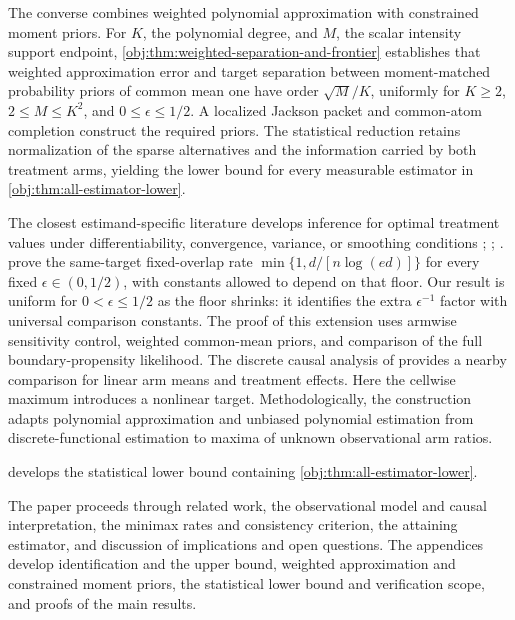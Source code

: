 \documentclass[11pt]{article}
\begin{document}
The converse combines weighted polynomial approximation with constrained moment priors. For \(K\), the polynomial degree, and \(M\), the scalar intensity support endpoint, \cref{obj:thm:weighted-separation-and-frontier} establishes that weighted approximation error and target separation between moment-matched probability priors of common mean one have order \(\sqrt M/K\), uniformly for \(K\ge2\), \(2\le M\le K^2\), and \(0\le\epsilon\le1/2\). A localized Jackson packet and common-atom completion construct the required priors. The statistical reduction retains normalization of the sparse alternatives and the information carried by both treatment arms, yielding the lower bound for every measurable estimator in \cref{obj:thm:all-estimator-lower}.

The closest estimand-specific literature develops inference for optimal treatment values under differentiability, convergence, variance, or smoothing conditions \citep[Theorems~1--2]{LuedtkeVanderLaan2016OptimalValue}; \citep[Theorems~2--3]{Shi2020}; \citep[Theorem~3.3 and Corollary~3.4]{WhitehouseChenAusternSyrgkanis2025}. \citet[Theorem~3]{CausalSmithFixedOverlap2026} prove the same-target fixed-overlap rate \(\min\{1,d/[n\log(ed)]\}\) for every fixed \(\epsilon\in(0,1/2)\), with constants allowed to depend on that floor. Our result is uniform for \(0<\epsilon\le1/2\) as the floor shrinks: it identifies the extra \(\epsilon^{-1}\) factor with universal comparison constants. The proof of this extension uses armwise sensitivity control, weighted common-mean priors, and comparison of the full boundary-propensity likelihood. The discrete causal analysis of \citet[Theorems~1--2]{ZengBalakrishnanHanKennedy2024Discrete} provides a nearby comparison for linear arm means and treatment effects. Here the cellwise maximum introduces a nonlinear target. Methodologically, the construction adapts polynomial approximation and unbiased polynomial estimation from discrete-functional estimation \citep{JiaoVenkatHanWeissman2015Functionals,JiaoHanWeissman2018L1} to maxima of unknown observational arm ratios.

 develops the statistical lower bound containing \cref{obj:thm:all-estimator-lower}.

The paper proceeds through related work, the observational model and causal interpretation, the minimax rates and consistency criterion, the attaining estimator, and discussion of implications and open questions. The appendices develop identification and the upper bound, weighted approximation and constrained moment priors, the statistical lower bound and verification scope, and proofs of the main results.
\end{document}
